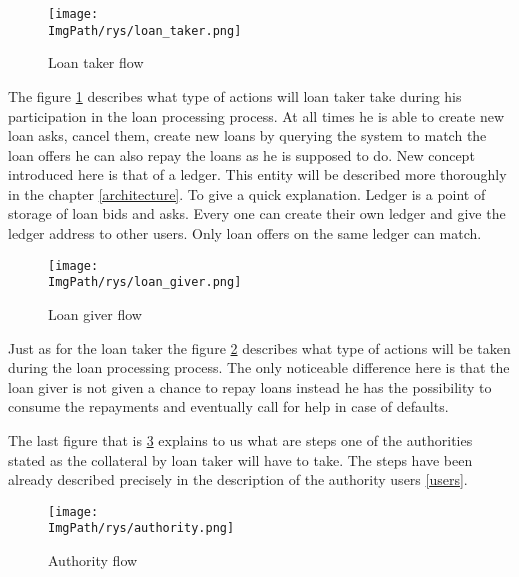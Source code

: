 \documentclass[a4paper,12pt,twoside,openany]{report}
\newcommand{\ImgPath}{.}
\begin{document}
\begin{figure}[!htbp]
	\begin{center}
\centering
\texttt{[image: \\ImgPath/rys/loan\_taker.png]}
\end{center}
	\caption{Loan taker flow}
	\label{loan taker}
\end{figure}

\newpage

The figure \ref{loan taker} describes what type of actions will loan taker take during his participation in the loan processing process. At all times he is able to create new loan asks, cancel them, create new loans by querying the system to match the loan offers he can also repay the loans as he is supposed to do. New concept introduced here is that of a ledger. This entity will be described more thoroughly in the chapter \ref{architecture}. To give a quick explanation. Ledger is a point of storage of loan bids and asks. Every one can create their own ledger and give the ledger address to other users. Only loan offers on the same ledger can match.

\begin{figure}[!htbp]
	\begin{center}
\centering
\texttt{[image: \\ImgPath/rys/loan\_giver.png]}
\end{center}
	\caption{Loan giver flow}
	\label{loan giver}
\end{figure}

Just as for the loan taker the figure \ref{loan giver} describes what type of actions will be taken during the loan processing process. The only noticeable difference here is that the loan giver is not given a chance to repay loans instead he has the possibility to consume the repayments and eventually call for help in case of defaults.

The last figure that is \ref{authority} explains to us what are steps one of the authorities stated as the collateral by loan taker will have to take. The steps have been already described precisely in the description of the authority users \ref{users}.


\begin{figure}[!htbp]
	\begin{center}
\centering
\texttt{[image: \\ImgPath/rys/authority.png]}
\end{center}
	\caption{Authority flow}
	\label{authority}
\end{figure}

\newpage
\end{document}

